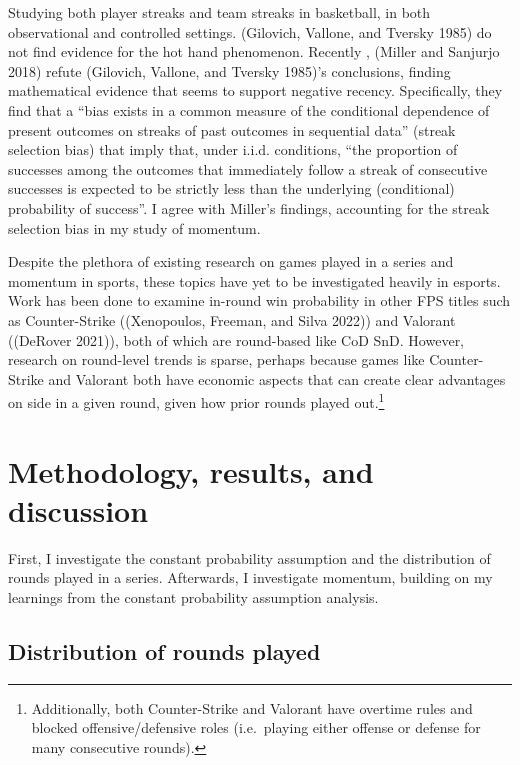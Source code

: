 \documentclass{article}
\begin{document}
Studying both player streaks and team streaks in basketball, in both
observational and controlled settings. (Gilovich, Vallone, and Tversky
1985) do not find evidence for the hot hand phenomenon. Recently ,
(Miller and Sanjurjo 2018) refute (Gilovich, Vallone, and Tversky
1985)'s conclusions, finding mathematical evidence that seems to support
negative recency. Specifically, they find that a ``bias exists in a
common measure of the conditional dependence of present outcomes on
streaks of past outcomes in sequential data'' (streak selection bias)
that imply that, under i.i.d. conditions, ``the proportion of successes
among the outcomes that immediately follow a streak of consecutive
successes is expected to be strictly less than the underlying
(conditional) probability of success''. I agree with Miller's findings,
accounting for the streak selection bias in my study of momentum.

Despite the plethora of existing research on games played in a series
and momentum in sports, these topics have yet to be investigated heavily
in esports. Work has been done to examine in-round win probability in
other FPS titles such as Counter-Strike ((Xenopoulos, Freeman, and Silva
2022)) and Valorant ((DeRover 2021)), both of which are round-based like
CoD SnD. However, research on round-level trends is sparse, perhaps
because games like Counter-Strike and Valorant both have economic
aspects that can create clear advantages on side in a given round, given
how prior rounds played out.\footnote{Additionally, both Counter-Strike
  and Valorant have overtime rules and blocked offensive/defensive roles
  (i.e.~playing either offense or defense for many consecutive rounds).}

\hypertarget{methodology-results-and-discussion}{%
\section{Methodology, results, and
discussion}\label{methodology-results-and-discussion}}

First, I investigate the constant probability assumption and the
distribution of rounds played in a series. Afterwards, I investigate
momentum, building on my learnings from the constant probability
assumption analysis.

\hypertarget{distribution-of-rounds-played}{%
\subsection{Distribution of rounds
played}\label{distribution-of-rounds-played}}
\end{document}
